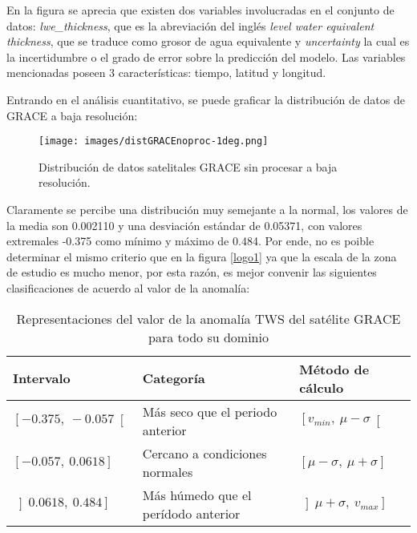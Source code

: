     En la figura se aprecia que existen dos variables involucradas en el conjunto de datos: \textit{lwe\_thickness}, que es la abreviación del inglés
    \textit{level water equivalent thickness}, que se traduce como grosor de agua equivalente y \textit{uncertainty} la cual es la incertidumbre
    o el grado de error sobre la predicción del modelo. Las variables mencionadas poseen 3 características: tiempo, latitud y longitud.

    Entrando en el análisis cuantitativo, se puede graficar la distribución de datos de GRACE a baja resolución:
    \begin{figure}[h]
        \centering
              \texttt{[image: images/distGRACEnoproc-1deg.png]}
        \caption[Distribución de datos satelitales a baja resolución]{\footnotesize Distribución de datos satelitales GRACE sin procesar a baja resolución.}
    \end{figure}
    
    Claramente se percibe una distribución muy semejante a la normal, los valores de la media son 0.002110 y una desviación estándar de 0.05371, con valores extremales -0.375 como mínimo y 
    máximo de 0.484. Por ende, no es poible determinar el mismo criterio que en la figura \ref{logo1} ya que la escala de la zona de estudio es mucho menor, por esta razón, es mejor convenir las siguientes clasificaciones
    de acuerdo al valor de la anomalía:

    \begin{table}[H] 
        \caption[Rangos de valores de la anomalía TWS en Chile]{Representaciones del valor de la anomalía TWS del satélite GRACE para todo su dominio}
        \begin{tabularx}{0.9\textwidth}{CCC}
        \toprule
        \textbf{Intervalo}	& \textbf{Categoría}	&\textbf{Método de cálculo}\\
            \midrule
            \textbf{$\left[-0\text{.}375,~-0\text{.}057\right[$}    & Más seco que el periodo anterior       & $\left[v_{min},~ \mu - \sigma\right[$\\
            \textbf{$[-0\text{.}057,~0\text{.}0618]$}	            & Cercano a condiciones normales         & $[\mu - \sigma,~ \mu +\sigma]$ \\
            \textbf{$\left]0\text{.}0618,~0\text{.}484\right] $}    & Más húmedo que el perídodo anterior    & $\left]\mu +\sigma,~v_{max}\right]$\\
            \bottomrule
        \end{tabularx}
    \end{table}
    
